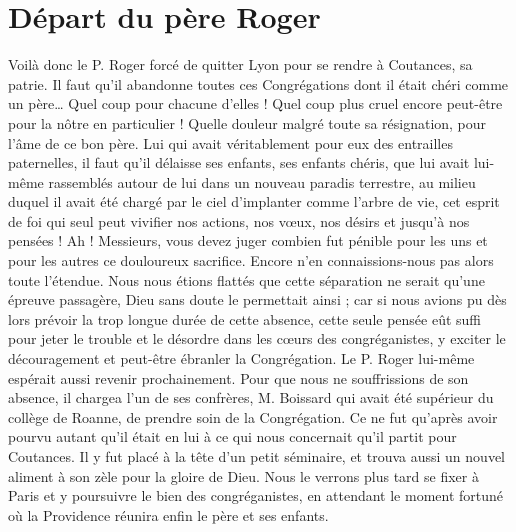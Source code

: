 \section*{Départ du père Roger}
Voilà donc le P. Roger forcé de quitter Lyon pour se rendre à Coutances, sa patrie. Il faut qu'il abandonne toutes ces Congrégations dont il était chéri comme un père… Quel coup pour chacune d'elles ! Quel coup plus cruel encore peut-être pour la nôtre en particulier ! Quelle douleur malgré toute sa résignation, pour l'âme de ce bon père. Lui qui avait véritablement pour eux des entrailles paternelles, il faut qu'il délaisse ses enfants, ses enfants chéris, que lui avait lui-même rassemblés autour de lui dans un nouveau paradis terrestre, au milieu duquel il avait été chargé par le ciel d'implanter comme l'arbre de vie, cet esprit de foi qui seul peut vivifier nos actions, nos vœux, nos désirs et jusqu'à nos pensées ! Ah ! Messieurs, vous devez juger combien fut pénible pour les uns et pour les autres ce douloureux sacrifice. Encore n'en connaissions-nous pas alors toute l'étendue. Nous nous étions flattés que cette séparation ne serait qu'une épreuve passagère, Dieu sans doute le permettait ainsi ; car si nous avions pu dès lors prévoir la trop longue durée de cette absence, cette seule pensée eût suffi pour jeter le trouble et le désordre dans les cœurs des congréganistes, y exciter le découragement et peut-être ébranler la Congrégation. Le P. Roger lui-même espérait aussi revenir prochainement. Pour que nous ne souffrissions de son
absence, il chargea l'un de ses confrères, M. Boissard qui avait été supérieur du collège de Roanne, de prendre soin de la Congrégation. Ce ne fut qu'après avoir pourvu autant qu'il était en lui à ce qui nous concernait qu'il partit pour Coutances. Il y fut placé à la tête d'un petit séminaire, et trouva aussi un nouvel aliment à son zèle pour la gloire de Dieu. Nous le verrons plus tard se fixer à Paris et y poursuivre le bien des congréganistes, en attendant le moment fortuné où la Providence réunira enfin le père et ses enfants.

